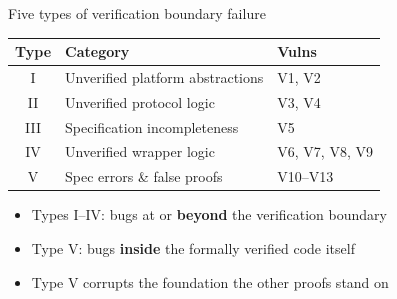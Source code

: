 \ifdefined\PRESENTATION\else\PassOptionsToClass{handout}{beamer}\fi\documentclass[aspectratio=169, lualatex]{beamer}
\begin{document}
\begin{frame}{Five types of verification boundary failure}
	\begin{center}
		\begin{tabular}{|c|l|l|}
			\hline
			\textbf{Type} & \textbf{Category}                & \textbf{Vulns} \\
			\hline
			I             & Unverified platform abstractions & V1, V2         \\
			\hline
			II            & Unverified protocol logic        & V3, V4         \\
			\hline
			III           & Specification incompleteness     & V5             \\
			\hline
			IV            & Unverified wrapper logic         & V6, V7, V8, V9 \\
			\hline
			V             & Spec errors \& false proofs      & V10--V13       \\
			\hline
		\end{tabular}
	\end{center}
	\vspace{1em}
	\begin{itemize}
		\item Types I--IV: bugs at or \textbf{beyond} the verification boundary
		\item Type V: bugs \textbf{inside} the formally verified code itself
		\item Type V corrupts the foundation the other proofs stand on
	\end{itemize}
\end{frame}
\end{document}
